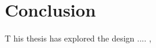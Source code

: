 \chapter*{Conclusion}
 \lettrine[lines=3, lhang=0.1, loversize=0.1]{T}{} his thesis has explored the design .... ,
 
 \lipsum[1-10] 